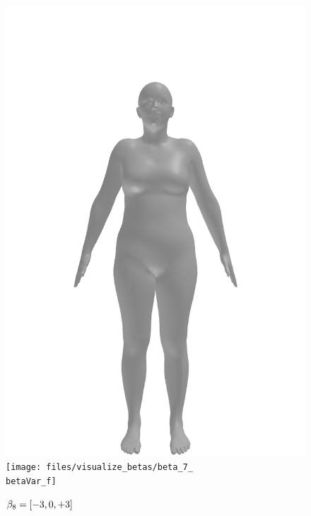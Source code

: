\begin{figure}[ht!]
\begin{minipage}[b]{\textwidth}
        \includegraphics[width=\imgWidth]{files/visualize_betas/baseline_f}
        \texttt{[image: files/visualize\_betas/beta\_7\_\\betaVar\_f]}
        \caption{$\beta_8 = [-3, 0, +3]$}
    \end{minipage}
\end{figure}

